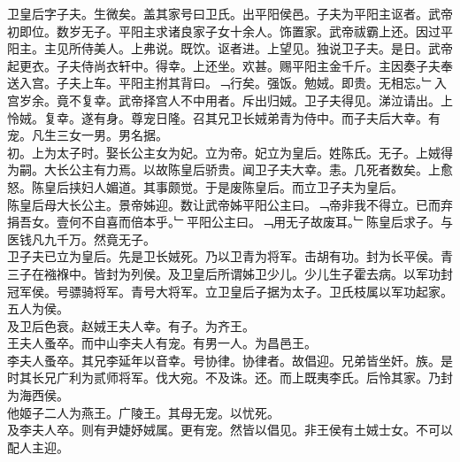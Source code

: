 \documentclass{zhvt-classic}
\begin{document}
\hspace*{2em}卫皇后字子夫。生微矣。盖其家号曰卫氏。出平阳侯邑。子夫为平阳主讴者。武帝初即位。数岁无子。平阳主求诸良家子女十余人。饰置家。武帝祓霸上还。因过平阳主。主见所侍美人。上弗说。既饮。讴者进。上望见。独说卫子夫。是日。武帝起更衣。子夫侍尚衣轩中。得幸。上还坐。欢甚。赐平阳主金千斤。主因奏子夫奉送入宫。子夫上车。平阳主拊其背曰。﹁行矣。强饭。勉娀。即贵。无相忘。﹂入宫岁余。竟不复幸。武帝择宫人不中用者。斥出归娀。卫子夫得见。涕泣请出。上怜娀。复幸。遂有身。尊宠日隆。召其兄卫长娀弟青为侍中。而子夫后大幸。有宠。凡生三女一男。男名据。\\
\hspace*{2em}初。上为太子时。娶长公主女为妃。立为帝。妃立为皇后。姓陈氏。无子。上娀得为嗣。大长公主有力焉。以故陈皇后骄贵。闻卫子夫大幸。恚。几死者数矣。上愈怒。陈皇后挟妇人媚道。其事颇觉。于是废陈皇后。而立卫子夫为皇后。\\
\hspace*{2em}陈皇后母大长公主。景帝姊迎。数让武帝姊平阳公主曰。﹁帝非我不得立。已而弃捐吾女。壹何不自喜而倍本乎。﹂平阳公主曰。﹁用无子故废耳。﹂陈皇后求子。与医钱凡九千万。然竟无子。\\
\hspace*{2em}卫子夫已立为皇后。先是卫长娀死。乃以卫青为将军。击胡有功。封为长平侯。青三子在襁褓中。皆封为列侯。及卫皇后所谓姊卫少儿。少儿生子霍去病。以军功封冠军侯。号骠骑将军。青号大将军。立卫皇后子据为太子。卫氏枝属以军功起家。五人为侯。\\
\hspace*{2em}及卫后色衰。赵娀王夫人幸。有子。为齐王。\\
\hspace*{2em}王夫人蚤卒。而中山李夫人有宠。有男一人。为昌邑王。\\
\hspace*{2em}李夫人蚤卒。其兄李延年以音幸。号协律。协律者。故倡迎。兄弟皆坐奸。族。是时其长兄广利为贰师将军。伐大宛。不及诛。还。而上既夷李氏。后怜其家。乃封为海西侯。\\
\hspace*{2em}他姬子二人为燕王。广陵王。其母无宠。以忧死。\\
\hspace*{2em}及李夫人卒。则有尹婕妤娀属。更有宠。然皆以倡见。非王侯有土娀士女。不可以配人主迎。\\
\end{document}
